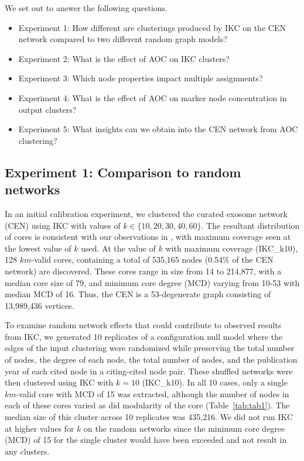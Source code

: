\documentclass[12pt, oneside]{article}   	%
\begin{document}
We set out to answer the following questions.

\begin{itemize}
\item Experiment 1: How different are clusterings  produced by IKC on the CEN network compared to two different random graph models?
\item Experiment 2:  What is the effect of AOC on IKC clusters?
\item Experiment 3:  Which node properties impact multiple assignments?
\item Experiment 4:  What is the effect of AOC on marker node concentration in output clusters? 
\item Experiment 5:  What insights can we obtain into the CEN network from AOC clustering?
\end{itemize}


\subsection{Experiment 1: Comparison to random networks} In an initial calibration experiment, we clustered the curated exosome network (CEN) using IKC with values of  $k \in {\{10,20,30,40, 60\}}$. The resultant distribution of cores is consistent with our observations in \cite[Figure~3]{Wedell2022}, with maximum coverage seen at the lowest value of $k$ used. At the value of $k$ with maximum coverage (IKC\_k10), 128 $km$-valid cores, containing a total of 535,165 nodes (0.54\% of the CEN network) are discovered. These cores range in size from 14 to 214,877, with a median core size of 79, and minimum core degree (MCD) varying from 10-53 with median MCD of 16. Thus, the CEN is a 53-degenerate graph consisting of 13,989,436 vertices.

To examine random network effects that could contribute to observed results from IKC, we generated 10 replicates of a configuration null model where the edges of the input clustering were randomized while preserving the total number of nodes, the degree of each node, the total number of nodes, and the publication year of each cited node in a citing-cited node pair. These shuffled networks were then clustered using IKC with  $k=10$ (IKC\_k10). In all 10 cases, only a single $km$-valid core with MCD of 15 was extracted, although the number of nodes in each of these cores varied as did modularity of the core (Table~\ref{tab:tab1}). The median size of this cluster across 10 replicates was 435,216. We did not run IKC at higher values for $k$ on the random networks since  the minimum core degree (MCD) of 15 for the single cluster would have been exceeded and not result in any clusters. 
\end{document}

